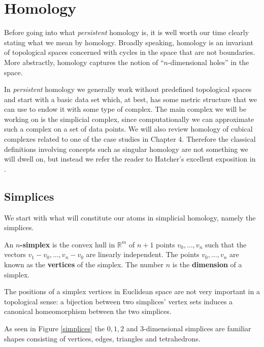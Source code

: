 \chapter{Homology}
Before going into what \textit{persistent} homology is, it is well worth our time clearly stating what we mean by homology. Broadly speaking, homology is an invariant of topological spaces concerned with cycles in the space that are not boundaries. More abstractly, homology captures the notion of ``$n$-dimensional holes'' in the space.

In \textit{persistent} homology we generally work without predefined topological spaces and start with a basic data set which, at best, has some metric structure that we can use to endow it with some type of complex. The main complex we will be working on is the simplicial complex, since computationally we can approximate such a complex on a set of data points. We will also review homology of cubical complexes related to one of the case studies in Chapter 4. Therefore the classical definitions involving concepts such as singular homology are not something we will dwell on, but instead we refer the reader to Hatcher's excellent exposition in \cite{hatcher2002}.


\section{Simplices}
We start with what will constitute our atoms in simplicial homology, namely the simplices.
\begin{definition}
  An \textbf{$n$-simplex} is the convex hull in $\mathbb{R}^{m}$ of $n+1$  points $v_{0},\dots,v_{n}$ such that the vectors $v_{1}-v_{0}, \dots, v_{n} - v_{0}$ are linearly independent. The points $v_{0},\dots,v_{n}$ are known as the \textbf{vertices} of the simplex. The number $n$ is the \textbf{dimension} of a simplex.
\end{definition}

The positions of a simplex vertices in Euclidean space are not very important in a topological sense: a bijection between two simplices' vertex sets induces a canonical homeomorphism between the two simplices.

As seen in Figure \ref{simplices} the $0,1,2$ and $3$-dimensional simplices are familiar shapes consisting of vertices, edges, triangles and tetrahedrons.

